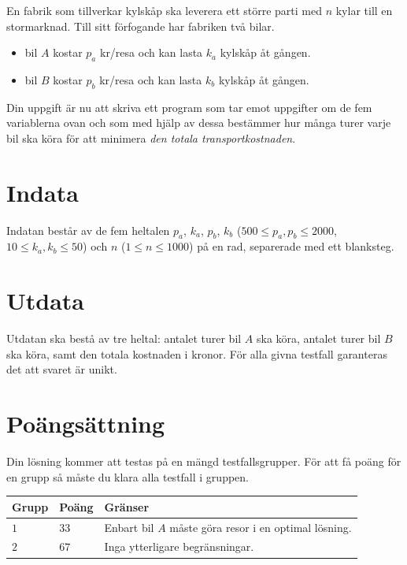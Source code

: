 
En fabrik som tillverkar kylskåp ska leverera ett större parti med $n$ kylar till en stormarknad. Till sitt förfogande har fabriken två bilar.

\begin{itemize}
  \item bil $A$ kostar $p_a$ kr/resa och kan lasta $k_a$ kylskåp åt gången.
  \item bil $B$ kostar $p_b$ kr/resa och kan lasta $k_b$ kylskåp åt gången.
\end{itemize}

Din uppgift är nu att skriva ett program som tar emot uppgifter om de fem variablerna ovan och som med hjälp av dessa bestämmer hur många turer varje bil ska köra för att minimera \emph{den totala transportkostnaden}.

\section*{Indata}
Indatan består av de fem heltalen $p_a$, $k_a$, $p_b$, $k_b$ ($500 \leq p_a, p_b \leq 2000$, $10 \leq k_a, k_b \leq 50$) och $n$ ($1 \leq n \leq 1000$) på en rad, separerade med ett blanksteg.

\section*{Utdata}
Utdatan ska bestå av tre heltal: antalet turer bil $A$ ska köra, antalet turer bil $B$ ska köra, samt den totala kostnaden i kronor.
För alla givna testfall garanteras det att svaret är unikt.

\section*{Poängsättning}
Din lösning kommer att testas på en mängd testfallsgrupper.
För att få poäng för en grupp så måste du klara alla testfall i gruppen.



\noindent
\begin{tabular}{| l | l | p{12cm} |}
  \hline
  \textbf{Grupp} & \textbf{Poäng} & \textbf{Gränser} \\ \hline
  $1$    & $33$        &  Enbart bil $A$ måste göra resor i en optimal lösning. \\ \hline
  $2$    & $67$        &  Inga ytterligare begränsningar. \\ \hline
\end{tabular}

